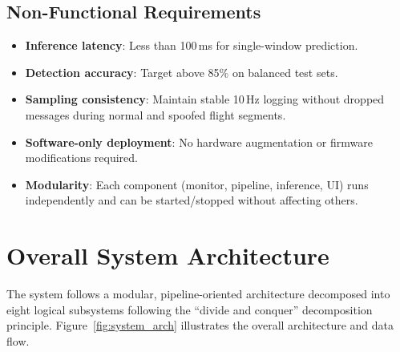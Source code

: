 \subsection{Non-Functional Requirements}
\begin{itemize}
    \item \textbf{Inference latency}: Less than 100\,ms for single-window prediction.
    \item \textbf{Detection accuracy}: Target above 85\% on balanced test sets.
    \item \textbf{Sampling consistency}: Maintain stable 10\,Hz logging without dropped messages during normal and spoofed flight segments.
    \item \textbf{Software-only deployment}: No hardware augmentation or firmware modifications required.
    \item \textbf{Modularity}: Each component (monitor, pipeline, inference, UI) runs independently and can be started/stopped without affecting others.
\end{itemize}

\section{Overall System Architecture}

The system follows a modular, pipeline-oriented architecture decomposed into eight logical subsystems following the ``divide and conquer'' decomposition principle. Figure~\ref{fig:system_arch} illustrates the overall architecture and data flow.

